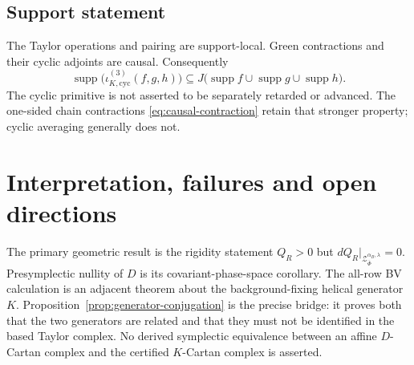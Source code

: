 \documentclass[11pt]{article}
\theoremstyle{definition}
\theoremstyle{remark}
\newcommand{\supp}{\operatorname{supp}}
\begin{document}
\subsection{Support statement}

The Taylor operations and pairing are support-local.  Green contractions and
their cyclic adjoints are causal.  Consequently
\begin{equation}\label{eq:support3}
 \supp\bigl(\iota_{K,\mathrm{cyc}}^{(3)}(f,g,h)\bigr)
 \subseteq J\bigl(\supp f\cup\supp g\cup\supp h\bigr).
\end{equation}
The cyclic primitive is not asserted to be separately retarded or advanced.
The one-sided chain contractions \eqref{eq:causal-contraction} retain that
stronger property; cyclic averaging generally does not.

\section{Interpretation, failures and open directions}\label{sec:limits}

The primary geometric result is the rigidity statement
$Q_R>0$ but $dQ_R|_{\mathcal Z_{\bar\Phi}^{\alpha_B,\lambda}}=0$.
Presymplectic nullity of $D$ is its covariant-phase-space corollary.  The
all-row BV calculation is an adjacent theorem about the background-fixing
helical generator $K$.  Proposition~\ref{prop:generator-conjugation} is the
precise bridge: it proves both that the two generators are related and that
they must not be identified in the based Taylor complex.  No derived
symplectic equivalence between an affine $D$-Cartan complex and the certified
$K$-Cartan complex is asserted.
\end{document}
